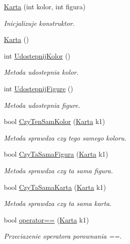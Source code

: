 \begin{DoxyCompactItemize}
\item 
\hyperlink{class_karta_a63932699b9420202b73dc91e1459f860}{Karta} (int kolor, int figura)
\begin{DoxyCompactList}\small\item\em Inicjalizuje konstruktor. \end{DoxyCompactList}\item 
\hyperlink{class_karta_ac2543022058bafb6434d37e3b57bf1dd}{Karta} ()
\item 
int \hyperlink{class_karta_a1644c9f78f572ecb3db7baf07aca4602}{Udostepnij\-Kolor} ()
\begin{DoxyCompactList}\small\item\em Metoda udostepnia kolor. \end{DoxyCompactList}\item 
int \hyperlink{class_karta_ad0dd49c878e587936262fb5ce00abc24}{Udostepnij\-Figure} ()
\begin{DoxyCompactList}\small\item\em Metoda udostepnia figure. \end{DoxyCompactList}\item 
bool \hyperlink{class_karta_a4aaa394b2347d25b74310265d844b0b7}{Czy\-Ten\-Sam\-Kolor} (\hyperlink{class_karta}{Karta} k1)
\begin{DoxyCompactList}\small\item\em Metoda sprawdza czy tego samego koloru. \end{DoxyCompactList}\item 
bool \hyperlink{class_karta_ab0decbab8d4483bcdde418a868595e4f}{Czy\-Ta\-Sama\-Figura} (\hyperlink{class_karta}{Karta} k1)
\begin{DoxyCompactList}\small\item\em Metoda sprawdza czy ta sama figura. \end{DoxyCompactList}\item 
bool \hyperlink{class_karta_a93f10992203fb64e034846cc87669a43}{Czy\-Ta\-Sama\-Karta} (\hyperlink{class_karta}{Karta} k1)
\begin{DoxyCompactList}\small\item\em Metoda sprawdza czy ta sama karta. \end{DoxyCompactList}\item 
bool \hyperlink{class_karta_a050540cbbf27cbce25d69f318899322b}{operator==} (\hyperlink{class_karta}{Karta} k1)
\begin{DoxyCompactList}\small\item\em Przeciazenie operatora porownania ==. \end{DoxyCompactList}\item 

\end{DoxyCompactItemize}
